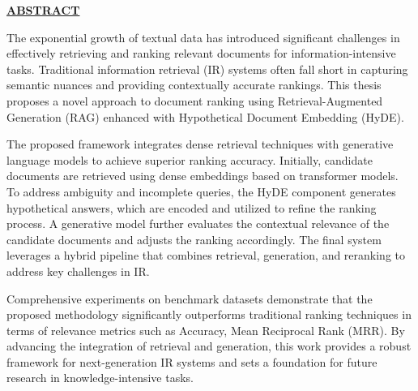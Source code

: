 
\thispagestyle{empty}
\begin{center}
{\underline{\bf\Large ABSTRACT }}\\
\par\vspace{5mm}
\end{center}

The exponential growth of textual data has introduced significant challenges in effectively retrieving and ranking relevant documents for information-intensive tasks. Traditional information retrieval (IR) systems often fall short in capturing semantic nuances and providing contextually accurate rankings. This thesis proposes a novel approach to document ranking using Retrieval-Augmented Generation (RAG)\cite{rag} enhanced with Hypothetical Document Embedding (HyDE)\cite{hyde}. 

The proposed framework integrates dense retrieval techniques with generative language models to achieve superior ranking accuracy. Initially, candidate documents are retrieved using dense embeddings based on transformer models. To address ambiguity and incomplete queries, the HyDE component generates hypothetical answers, which are encoded and utilized to refine the ranking process. A generative model further evaluates the contextual relevance of the candidate documents and adjusts the ranking accordingly. The final system leverages a hybrid pipeline that combines retrieval, generation, and reranking to address key challenges in IR.

Comprehensive experiments on benchmark datasets demonstrate that the proposed methodology significantly outperforms traditional ranking techniques in terms of relevance metrics such as Accuracy, Mean Reciprocal Rank (MRR). By advancing the integration of retrieval and generation, this work provides a robust framework for next-generation IR systems and sets a foundation for future research in knowledge-intensive tasks.

